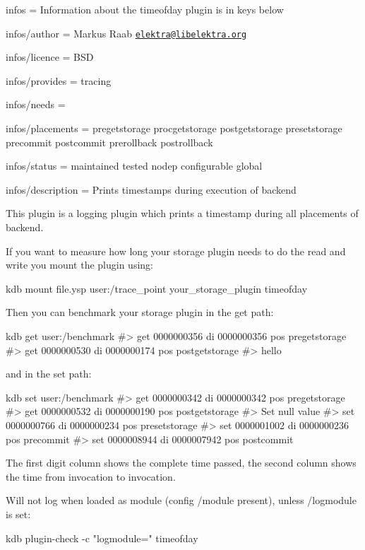 
\begin{DoxyItemize}
\item infos = Information about the timeofday plugin is in keys below
\item infos/author = Markus Raab \href{mailto:elektra@libelektra.org}{\tt elektra@libelektra.\+org}
\item infos/licence = B\+SD
\item infos/provides = tracing
\item infos/needs =
\item infos/placements = pregetstorage procgetstorage postgetstorage presetstorage precommit postcommit prerollback postrollback
\item infos/status = maintained tested nodep configurable global
\item infos/description = Prints timestamps during execution of backend
\end{DoxyItemize}

This plugin is a logging plugin which prints a timestamp during all placements of backend.

If you want to measure how long your storage plugin needs to do the read and write you mount the plugin using\+:


\begin{DoxyCode}
kdb mount file.ysp user:/trace\_point your\_storage\_plugin timeofday
\end{DoxyCode}


Then you can benchmark your storage plugin in the get path\+:


\begin{DoxyCode}
kdb get user:/benchmark
#> get     0000000356      di      0000000356      pos     pregetstorage
#> get     0000000530      di      0000000174      pos     postgetstorage
#> hello
\end{DoxyCode}


and in the set path\+:


\begin{DoxyCode}
kdb set user:/benchmark
#> get     0000000342      di      0000000342      pos     pregetstorage
#> get     0000000532      di      0000000190      pos     postgetstorage
#> Set null value
#> set     0000000766      di      0000000234      pos     presetstorage
#> set     0000001002      di      0000000236      pos     precommit
#> set     0000008944      di      0000007942      pos     postcommit
\end{DoxyCode}


The first digit column shows the complete time passed, the second column shows the time from invocation to invocation.

Will not log when loaded as module (config {\ttfamily /module} present), unless {\ttfamily /logmodule} is set\+:


\begin{DoxyCode}
kdb plugin-check -c "logmodule=" timeofday
\end{DoxyCode}
 